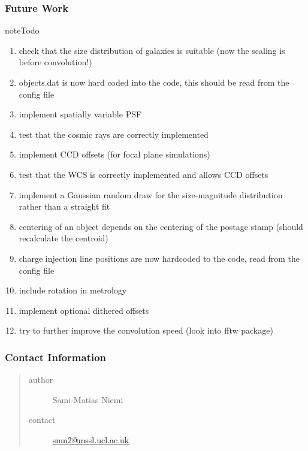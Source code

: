 \documentclass[a4paper,12pt,english]{sphinxmanual}
\begin{document}
\subsubsection{Future Work}
\label{simulator:future-work}
\begin{notice}{note}{Todo}
\begin{enumerate}
\item {} 
check that the size distribution of galaxies is suitable (now the scaling is before convolution!)

\item {} 
objects.dat is now hard coded into the code, this should be read from the config file

\item {} 
implement spatially variable PSF

\item {} 
test that the cosmic rays are correctly implemented

\item {} 
implement CCD offsets (for focal plane simulations)

\item {} 
test that the WCS is correctly implemented and allows CCD offsets

\item {} 
implement a Gaussian random draw for the size-magnitude distribution rather than a straight fit

\item {} 
centering of an object depends on the centering of the postage stamp (should recalculate the centroid)

\item {} 
charge injection line positions are now hardcoded to the code, read from the config file

\item {} 
include rotation in metrology

\item {} 
implement optional dithered offsets

\item {} 
try to further improve the convolution speed (look into fftw package)

\end{enumerate}
\end{notice}


\subsubsection{Contact Information}
\label{simulator:contact-information}\begin{quote}\begin{description}
\item[{author}] \leavevmode
Sami-Matias Niemi

\item[{contact}] \leavevmode
\href{mailto:smn2@mssl.ucl.ac.uk}{smn2@mssl.ucl.ac.uk}

\end{description}\end{quote}
\end{document}
